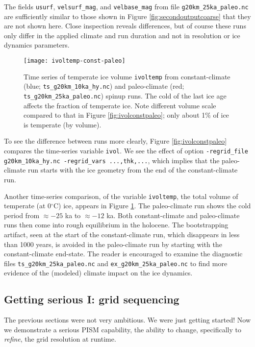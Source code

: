 The fields \texttt{usurf}, \texttt{velsurf_mag}, and \texttt{velbase_mag} from file \texttt{g20km_25ka_paleo.nc} are sufficiently similar to those shown in Figure \ref{fig:secondoutputcoarse} that they are not shown here.  Close inspection reveals differences, but of course these runs only differ in the applied climate and run duration and not in resolution or ice dynamics parameters.

\begin{figure}[ht]
\centering
\texttt{[image: ivoltemp-const-paleo]}
\caption{Time series of temperate ice volume \texttt{ivoltemp} from constant-climate (blue; \texttt{ts_g20km_10ka_hy.nc}) and paleo-climate (red; \texttt{ts_g20km_25ka_paleo.nc}) spinup runs.  The cold of the last ice age affects the fraction of temperate ice.  Note different volume scale compared to that in Figure \ref{fig:ivolconstpaleo}; only about 1\% of ice is temperate (by volume).}
\label{fig:ivoltempconstpaleo}
\end{figure}

To see the difference between runs more clearly, Figure \ref{fig:ivolconstpaleo} compares the time-series variable \texttt{ivol}.  We see the effect of option \verb|-regrid_file g20km_10ka_hy.nc -regrid_vars ...,thk,...|, which implies that the paleo-climate run starts with the ice geometry from the end of the constant-climate run.

Another time-series comparison, of the variable \verb|ivoltemp|, the total volume of temperate (at 0$^\circ$C) ice, appears in Figure \ref{fig:ivoltempconstpaleo}.  The paleo-climate run shows the cold period from $\approx -25$ ka to $\approx -12$ ka.  Both constant-climate and paleo-climate runs then come into rough equilibrium in the holocene.  The bootstrapping artifact, seen at the start of the constant-climate run, which disappears in less than 1000 years, is avoided in the paleo-climate run by starting with the constant-climate end-state.  The reader is encouraged to examine the diagnostic files \texttt{ts_g20km_25ka_paleo.nc} and \texttt{ex_g20km_25ka_paleo.nc} to find more evidence of the (modeled) climate impact on the ice dynamics.


\subsection{Getting serious I: grid sequencing}  \label{subsect:gridseq}  

The previous sections were not very ambitious.  We were just getting started!  Now we demonstrate a serious PISM capability, the ability to change, specifically to \emph{refine}, the grid resolution at runtime.

